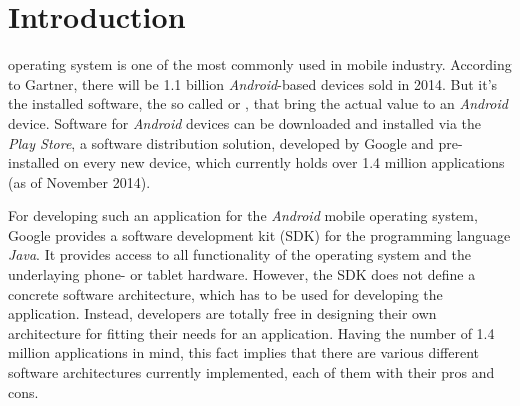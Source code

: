 \section{Introduction}

 operating system is one of the most 
commonly used in mobile industry. According to Gartner, there will be 1.1 
billion \emph{Android}-based devices sold in 2014.
But it's the installed software, the so called  or 
, that bring the actual value to an \emph{Android} device.
Software for \emph{Android} devices can be downloaded and installed via the 
\emph{Play Store}, a software distribution solution, developed by Google and 
pre-installed on every new device, which currently holds over 1.4 million 
applications (as of November 2014).

For developing such an application for the \emph{Android} mobile operating 
system, Google provides a software development kit (SDK) for the programming 
language \emph{Java}. It provides access to all functionality of the 
operating system and the underlaying phone- or tablet hardware.
However, the SDK does not define a concrete software architecture, which has to 
be used for developing the application. Instead, developers are totally free in 
designing their own architecture for fitting their needs for an application.
Having the number of 1.4 million applications in mind, this fact implies that 
there are various different software architectures currently implemented, each 
of them with their pros and cons.

